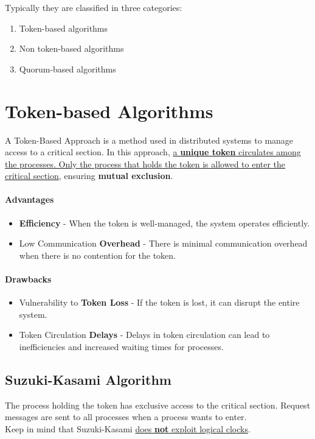 Typically they are classified in three categories:
\begin{enumerate}
   \item Token-based algorithms
   \item Non token-based algorithms
   \item Quorum-based algorithms
\end{enumerate}

\newpage
\section{Token-based Algorithms}
A Token-Based Approach is a method used in distributed systems to manage access to a critical section. In this approach, \ul{a \textbf{unique token} circulates among the processes. Only the process that holds the token is allowed to enter the critical section}, ensuring \textbf{mutual exclusion}.

\paragraph*{Advantages}
\begin{itemize}
   \item \textbf{Efficiency} - When the token is well-managed, the system operates efficiently.
   \item Low Communication \textbf{Overhead} - There is minimal communication overhead when there is no contention for the token.
\end{itemize}

\paragraph*{Drawbacks}
\begin{itemize}
   \item Vulnerability to \textbf{Token Loss} - If the token is lost, it can disrupt the entire system.
   \item Token Circulation \textbf{Delays} - Delays in token circulation can lead to inefficiencies and increased waiting times for processes.
\end{itemize}

\subsection{Suzuki-Kasami Algorithm}
The process holding the token has exclusive access to the critical section. Request messages are sent to all processes when a process wants to enter.\\
Keep in mind that Suzuki-Kasami \ul{does \textbf{not} exploit logical clocks}. 

